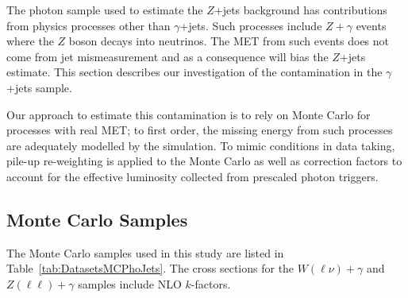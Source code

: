 The photon sample used to estimate the $Z$+jets background has contributions from physics processes other than $\gamma$+jets.
Such processes include $Z+\gamma$ events where the $Z$ boson decays into neutrinos. The MET from such events does not come from
jet mismeasurement and as a consequence will bias the $Z$+jets estimate. This section describes our investigation of the 
contamination in the $\gamma$+jets sample.

Our approach to estimate this contamination is to rely on Monte Carlo for processes with real MET; to first order, the missing
energy from such processes are adequately modelled by the simulation. To mimic conditions in data taking, pile-up re-weighting
is applied to the Monte Carlo as well as correction factors to account for the effective luminosity collected from prescaled
photon triggers. 

\subsection{Monte Carlo Samples}

The Monte Carlo samples used in this study are listed in Table~\ref{tab:DatasetsMCPhoJets}. The cross sections for the $W(\ell\nu)+\gamma$ 
and $Z(\ell\ell)+\gamma$ samples include NLO $k$-factors.

